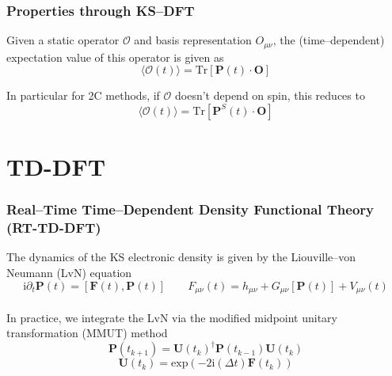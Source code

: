 \documentclass{beamer}
\newcommand{\bpar}[1]{\left( #1 \right)}                  %
\newcommand{\comm}[2]{\left[ #1 , #2\right]}
\renewcommand{\exp}[1]{\mathrm{exp}\bpar{#1}}
\begin{document}
\begin{frame}
\frametitle{Properties through KS--DFT}

Given a static operator $\mathcal{O}$ and basis representation $O_{\mu\nu}$, the (time--dependent) expectation value
of this operator is given as
\begin{equation*}
\langle \mathcal{O}(t) \rangle = \mathrm{Tr}[\mathbf{P}(t)\cdot\mathbf{O}]
\end{equation*}

In particular for 2C methods, if $\mathcal{O}$ doesn't depend on spin, this reduces to
\begin{equation*}
\langle \mathcal{O}(t) \rangle = \mathrm{Tr}[\mathbf{P}^S(t)\cdot\mathbf{O}]
\end{equation*}

\end{frame}

\section{TD-DFT}

\begin{frame}
\frametitle{Real--Time Time--Dependent Density Functional Theory (RT-TD-DFT)}

The dynamics of the KS electronic density is given by the Liouville--von Neumann (LvN) equation
\begin{equation*}
  \mathrm{i}\partial_t\mathbf{P}(t) = \comm{\mathbf{F}(t)}{\mathbf{P}(t)} \qquad F_{\mu\nu}(t) = h_{\mu\nu} + G_{\mu\nu}[\mathbf{P}(t)] + V_{\mu\nu}(t)
\end{equation*}
~\\

In practice, we integrate the LvN via the modified midpoint unitary transformation (MMUT)
method
\begin{equation*}
\mathbf{P}(t_{k+1}) = \mathbf{U}(t_k)^\dagger \mathbf{P}(t_{k-1}) \mathbf{U}(t_k)
\end{equation*}
\begin{equation*}
\mathbf{U}(t_k) = \exp{-2\mathrm{i}(\Delta t) \mathbf{F}(t_k)}
\end{equation*}

\end{frame}
\end{document}
